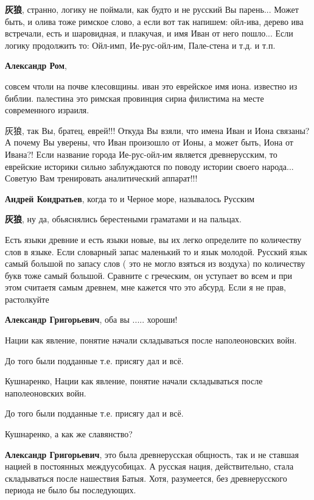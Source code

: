 \begin{itemize}
\begin{itemize}
\textbf{灰狼}, странно, логику не поймали, как будто и не русский Вы парень... Может быть, и олива тоже римское слово, а если вот так напишем: ойл-ива, дерево ива встречали, есть и шаровидная, и плакучая, и имя Иван от него пошло... Если логику продолжить то: Ойл-имп, Ие-рус-ойл-им, Пале-стена и т.д. и т.п.

\textbf{Александр Ром}, 

совсем чтоли на почве клесовщины. иван это еврейское имя иона. известно из
библии. палестина это римская провинция сириа филистима на месте современного
израиля.

灰狼, так Вы, братец, еврей!!! Откуда Вы взяли, что имена Иван и Иона связаны?
А почему Вы уверены, что Иван произошло от Ионы, а может быть, Иона от Ивана?!
Если название города Ие-рус-ойл-им является древнерусским, то еврейские
историки сильно заблуждаются по поводу истории своего народа... Советую Вам
тренировать аналитический аппарат!!!

\textbf{Андрей Кондратьев}, когда то и Черное море, называлось Русским

\textbf{灰狼}, ну да, обьяснялись берестеными граматами и на пальцах.

Есть языки древние и есть языки новые, вы их легко определите по количеству
слов в языке. Если словарный запас маленький то и язык молодой. Русский язык
самый большой по запасу слов ( это не могло взяться из воздуха) по количеству
букв тоже самый большой. Сравните с греческим, он уступает во всем и при этом
считаетя самым древнем, мне кажется что это абсурд. Если я не прав, растолкуйте

\textbf{Александр Григорьевич}, оба вы ..... хороши!

Нации как явление, понятие начали складываться после наполеоновских войн.

До того были подданные т.е. присягу дал и всё.

Кушнаренко, Нации как явление, понятие начали складываться после наполеоновских войн.

До того были подданные т.е. присягу дал и всё.


Кушнаренко, а как же славянство?

\textbf{Александр Григорьевич}, это была древнерусская общность, так и не ставшая нацией
в постоянных междуусобицах. А русская нация, действительно, стала складываться
после нашествия Батыя. Хотя, разумеется, без древнерусского периода не было бы
последующих.  


\end{itemize}
\end{itemize}
